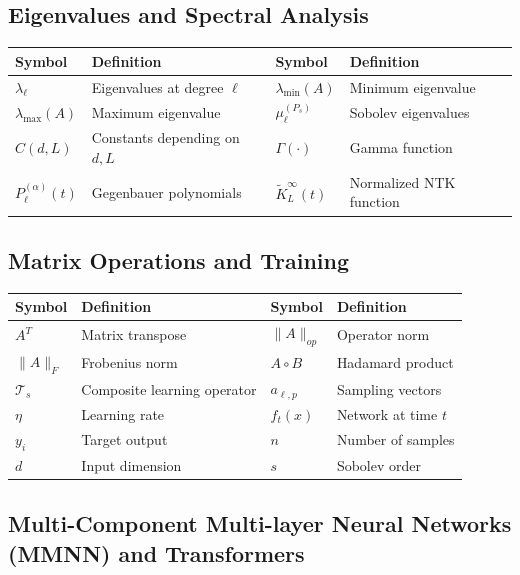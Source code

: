 \documentclass[a4paper]{article}
\theoremstyle{plain}
\theoremstyle{definition}
\theoremstyle{remark}
\begin{document}
\begin{tcolorbox}[colback=blue!5,colframe=blue!50!black,title={\large \textbf{Mathematical Notation Reference (continued)}},enhanced,drop shadow]
\subsection*{Eigenvalues and Spectral Analysis}
\begin{longtable}{p{}p{}p{}p{}}
\toprule
\textbf{Symbol} & \textbf{Definition} & \textbf{Symbol} & \textbf{Definition} \\
\midrule
$\lambda_\ell$ & Eigenvalues at degree $\ell$ & $\lambda_{\min}(A)$ & Minimum eigenvalue \\
$\lambda_{\max}(A)$ & Maximum eigenvalue & $\mu_\ell^{(P_s)}$ & Sobolev eigenvalues \\
$C(d,L)$ & Constants depending on $d,L$ & $\Gamma(\cdot)$ & Gamma function \\
$P_\ell^{(\alpha)}(t)$ & Gegenbauer polynomials & $\tilde{K}_L^{\infty}(t)$ & Normalized NTK function \\
\bottomrule
\end{longtable}

\subsection*{Matrix Operations and Training}
\begin{longtable}{p{}p{}p{}p{}}
\toprule
\textbf{Symbol} & \textbf{Definition} & \textbf{Symbol} & \textbf{Definition} \\
\midrule
$A^T$ & Matrix transpose & $\|A\|_{op}$ & Operator norm \\
$\|A\|_F$ & Frobenius norm & $A \circ B$ & Hadamard product \\
$\mathcal{T}_s$ & Composite learning operator & $a_{\ell,p}$ & Sampling vectors \\
$\eta$ & Learning rate & $f_t(x)$ & Network at time $t$ \\
$y_i$ & Target output & $n$ & Number of samples \\
$d$ & Input dimension & $s$ & Sobolev order \\
\bottomrule
\end{longtable}

\end{tcolorbox}

\newpage





\subsection{Multi-Component Multi-layer Neural Networks (MMNN) and Transformers}
\end{document}
